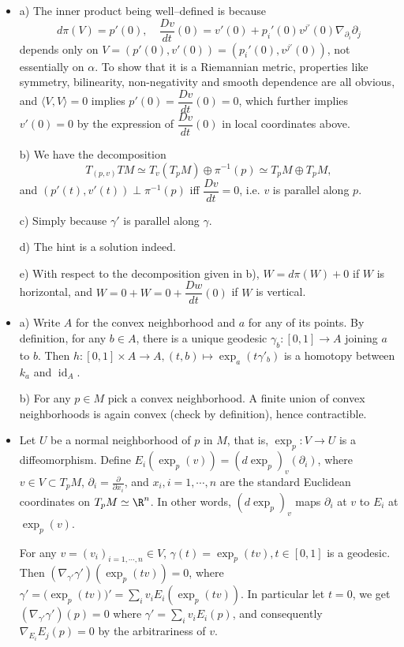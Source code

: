 \begin{itemize}
    \item[2.] a) The inner product being well--defined is because 
    \[d\pi(V)=p'(0),\quad \frac{Dv}{dt}(0)
    =v'(0)+p_i'(0)v^{j\prime}(0)\nabla_{\partial_i}\partial_j\]
    depends only on $V=(p'(0),v'(0))=(p_i'(0),v^{j\prime}(0))$, 
    not essentially on $\alpha$.
    To show that it is a Riemannian metric, properties like 
    symmetry, bilinearity, non-negativity and smooth dependence are all obvious, 
    and $\langle V,V\rangle=0$ implies $p'(0)=\dfrac{Dv}{dt}(0)=0$, 
    which further implies $v'(0)=0$ by the expression of 
    $\dfrac{Dv}{dt}(0)$ in local coordinates above.

    b) We have the decomposition
    \[T_{(p,v)}TM\simeq T_v(T_pM)\oplus\pi^{-1}(p)\simeq T_pM\oplus T_pM,\]
    and $(p'(t),v'(t))\perp\pi^{-1}(p)$ iff $\dfrac{Dv}{dt}=0$, 
    i.e. $v$ is parallel along $p$.

    c) Simply because $\gamma'$ is parallel along $\gamma$.

    d) The hint is a solution indeed.

    e) With respect to the decomposition given in b), 
    $W=d\pi(W)+0$ if $W$ is horizontal, 
    and $W=0+W=0+\dfrac{Dw}{dt}(0)$ if $W$ is vertical.

    \item[4.] a) Write $A$ for the convex neighborhood 
    and $a$ for any of its points. 
    By definition, for any $b\in A$, there is a unique geodesic 
    $\gamma_{b}\colon [0,1]\to A$ joining $a$ to $b$. 
    Then $h\colon [0,1]\times A \to A,
    (t,b)\mapsto\operatorname{exp}_a(t\gamma'_b)$ 
    is a homotopy between $k_a$ and $\operatorname{id}_A$.

    b) For any $p\in M$ pick a convex neighborhood. 
    A finite union of convex neighborhoods is again convex 
    (check by definition), hence contractible.

    \item[7.] Let $U$ be a normal neighborhood of $p$ in $M$, 
    that is, $\exp_p\colon V\to U$ is a diffeomorphism. 
    Define $E_i(\exp_p(v))=(d\exp_p)_v(\partial_i)$, 
    where $v\in V\subset T_pM$, $\partial_i=\frac{\partial}{\partial x_i}$, 
    and $x_i,i=1,\cdots,n$ are the standard Euclidean coordinates 
    on $T_pM\simeq\R^n$. In other words, $(d\exp_p)_v$ 
    maps $\partial_i$ at $v$ to $E_i$ at $\exp_p(v)$.

    For any $v=(v_i)_{i=1,\cdots,n}\in V$, 
    $\gamma(t)=\exp_p(tv),t\in[0,1]$ is a geodesic. 
    Then $(\nabla_{\gamma'}\gamma')(\exp_p(tv))=0$, 
    where $\gamma'=\big(\exp_p(tv)\big)'=\sum\limits_i v_iE_i(\exp_p(tv))$. 
    In particular let $t=0$, we get $(\nabla_{\gamma'}\gamma')(p)=0$ 
    where $\gamma'=\sum\limits_i v_iE_i(p)$, 
    and consequently $\nabla_{E_i}E_j(p)=0$ by the arbitrariness of $v$.


\end{itemize}
